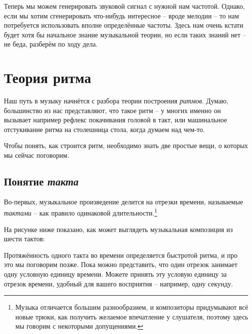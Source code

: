 \documentclass[a4paper,twoside]{book}
\begin{document}
Теперь мы можем генерировать звуковой сигнал с нужной нам частотой. Однако, если
мы хотим сгенерировать что-нибудь интересное -- вроде мелодии -- то нам
потребуется использовать вполне определённые частоты. Здесь нам очень кстати
будет хотя бы начальное знание музыкальной теории, но если таких знаний нет --
не беда, разберём по ходу дела.

\section{Теория ритма}

Наш путь в музыку начнётся с разбора теории построения \emph{ритмов}. Думаю,
большинство из нас представляют, что такое ритм -- у многих именно он вызывает
например рефлекс покачивания головой в такт, или машинальное отстукивание ритма
на столешница стола, когда думаем над чем-то.

Чтобы понять, как строится ритм, необходимо знать две простые вещи, о которых мы
сейчас поговорим.

\subsection{Понятие \emph{такта}}

Во-первых, музыкальное произведение делится на отрезки времени, называемые
\emph{тактами} -- как правило одинаковой длительности.\footnote{Музыка отличается
большим разнообразием, и композиторы придумывают всё новые трюки, как получить
желаемое впечатление у слушателя, поэтому здесь мы говорим с некоторыми
допущениями.}

На рисунке ниже показано, как может выглядеть музыкальная композиция из шести
тактов:


Протяжённость одного такта во времени определяется быстротой ритма, и про это мы
поговорим позже. Пока можно представить, что один отрезок занимает одну условную
единицу времени. Можете принять эту условую единицу за отрезок времени, удобный
для вашего восприятия -- например, одну секунду.
\end{document}
